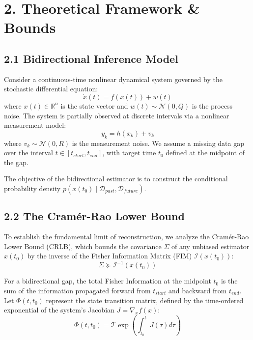 \documentclass[aps,prl,reprint,superscriptaddress,nofootinbib]{revtex4-2}
\begin{document}
\section{2. Theoretical Framework \& Bounds}

\subsection{2.1 Bidirectional Inference Model}
Consider a continuous-time nonlinear dynamical system governed by the stochastic differential equation:
\begin{equation}
\dot{x}(t) = f(x(t)) + w(t)
\end{equation}
where $x(t) \in \mathbb{R}^n$ is the state vector and $w(t) \sim \mathcal{N}(0, Q)$ is the process noise. The system is partially observed at discrete intervals via a nonlinear measurement model:
\begin{equation}
y_k = h(x_k) + v_k
\end{equation}
where $v_k \sim \mathcal{N}(0, R)$ is the measurement noise. We assume a missing data gap over the interval $t \in [t_{start}, t_{end}]$, with target time $t_0$ defined at the midpoint of the gap.

The objective of the bidirectional estimator is to construct the conditional probability density $p(x(t_0) \mid \mathcal{D}_{past}, \mathcal{D}_{future})$.

\subsection{2.2 The Cram\'{e}r-Rao Lower Bound}
To establish the fundamental limit of reconstruction, we analyze the Cram\'{e}r-Rao Lower Bound (CRLB), which bounds the covariance $\Sigma$ of any unbiased estimator $\hat{x}(t_0)$ by the inverse of the Fisher Information Matrix (FIM) $\mathcal{I}(x(t_0))$:
\begin{equation}
\Sigma \succeq \mathcal{I}^{-1}(x(t_0))
\end{equation}

For a bidirectional gap, the total Fisher Information at the midpoint $t_0$ is the sum of the information propagated forward from $t_{start}$ and backward from $t_{end}$. Let $\Phi(t, t_0)$ represent the state transition matrix, defined by the time-ordered exponential of the system's Jacobian $J = \nabla_x f(x)$:
\begin{equation}
\Phi(t, t_0) = \mathcal{T}\exp \left( \int_{t_0}^t J(\tau) d\tau \right)
\end{equation}
\end{document}
